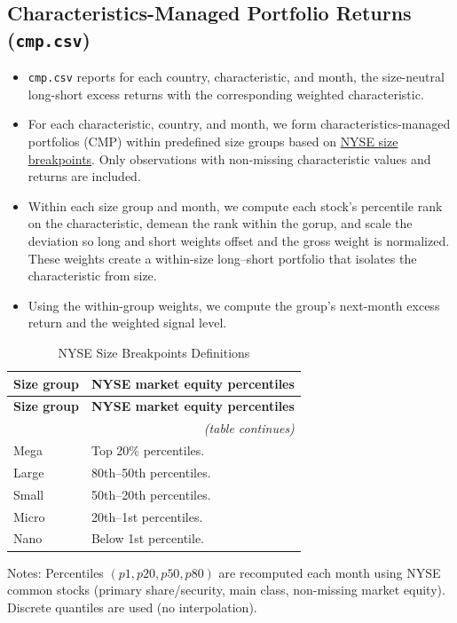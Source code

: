 \documentclass[12pt,title,fleqn]{article}
\begin{document}
\subsection{Characteristics-Managed Portfolio Returns (\texttt{cmp.csv})}
\begin{itemize}
    \item \texttt{cmp.csv} reports for each country, characteristic, and month, the size-neutral long-short excess returns with the corresponding weighted characteristic.
    \item For each characteristic, country, and month, we form characteristics-managed portfolios (CMP) within predefined  size groups based on \hyperref[app:nyse-breakpoints]{NYSE size breakpoints}. Only observations with non-missing characteristic values and returns are included.
    \item Within each size group and month, we compute each stock's percentile rank on the characteristic, demean the rank within the gorup, and scale the deviation so long and short weights offset and the gross weight is normalized. These weights create a within-size long–short portfolio that isolates the characteristic from size.
    \item Using the within-group weights, we compute the group’s next-month excess return and the weighted signal level.
\end{itemize}

{\scriptsize
\begin{longtable}{|p{}|p{}|}
\caption{NYSE Size Breakpoints Definitions}\label{app:nyse-breakpoints}\\
\hline
\textbf{Size group} & \textbf{NYSE market equity percentiles} \\
\hline
\endfirsthead

\hline
\textbf{Size group} & \textbf{NYSE market equity percentiles} \\
\hline
\endhead

\hline
\multicolumn{2}{r}{\textit{(table continues)}}\\
\endfoot

\hline
\endlastfoot

Mega\rule{0pt}{10pt}  & Top 20\% percentiles. \\[1ex]

Large & 80th--50th percentiles. \\[1ex]

Small & 50th--20th percentiles. \\[1ex]

Micro & 20th--1st percentiles. \\[1ex]

Nano  & Below 1st percentile. \\
\end{longtable}
\vspace{-0.4\baselineskip} %
\noindent\footnotesize Notes: Percentiles \((p1,p20,p50,p80)\) are recomputed each month using NYSE common stocks (primary share/security, main class, non-missing market equity). Discrete quantiles are used (no interpolation).
}
\end{document}
